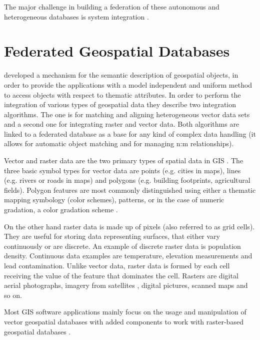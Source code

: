 \documentclass[12pt,a4paper]{report}
\newcommand{\acr}{\MakeUppercase}
\begin{document}
	The major challenge in building a federation of these autonomous and heterogeneous databases is system integration \citep{Malik}.
	\\



	\chapter{Federated Geospatial Databases}
	\label{sec:fed_geodata}

	\citet{Butenuth} developed a mechanism for the semantic description of 
	geospatial objects, in order to provide the applications with a model 
	independent and uniform method to access objects with respect to thematic 
	attributes. In order to perform the integration of various types of 
	geospatial data they describe two integration algorithms. The one is for 
	matching and aligning heterogeneous vector data sets and a second one for 
	integrating raster and vector data. Both algorithms are linked to a 
	federated database as a base for any kind of complex data handling (it 
	allows for automatic object matching and for managing n:m relationships).
	\par
	Vector and raster data are the two primary types of spatial data in 
	\acr{gis} \citep{gisGeography}. The three basic symbol types for vector 
	data are points (e.g. cities in maps), lines (e.g. rivers or roads in maps) 
	and polygons (e.g. building footprints, agricultural fields). Polygon 
	features are most commonly distinguished using either a thematic mapping 
	symbology (color schemes), patterns, or in the case of numeric gradation, 
	a color gradation scheme \citep{Dempsey}.
	\par 
	On the other hand raster data is made up of pixels (also referred to as 
	grid cells). They are useful for storing data representing surfaces, that 
	either vary continuously or are discrete. An example of discrete raster 
	data is population density. Continuous data examples are temperature,
	elevation measurements and lead contamination. Unlike vector data, raster 
	data is formed by each cell receiving the value of the feature that 
	dominates the cell. Rasters are digital aerial photographs, imagery from 
	satellites \citep{Butenuth}, digital pictures, scanned maps and so on.
	\par
	Most \acr{gis} software applications mainly focus on the usage and 
	manipulation of vector geospatial databases with added components to work 
	with raster-based geospatial databases \citep{Dempsey}.
	\\
\end{document}
